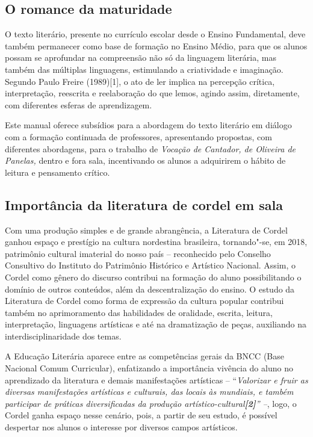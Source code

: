 \documentclass[12pt]{extarticle}
\begin{document}


\subsection{O romance da maturidade}

O texto literário, presente no currículo escolar desde o Ensino
Fundamental, deve também permanecer como base de formação no Ensino
Médio, para que os alunos possam se aprofundar na compreensão não só da
linguagem literária, mas também das múltiplas linguagens, estimulando a
criatividade e imaginação. Segundo Paulo Freire (1989){[}1{]}, o ato de
ler implica na percepção crítica, interpretação, reescrita e
reelaboração do que lemos, agindo assim, diretamente, com diferentes
esferas de aprendizagem.

Este manual oferece subsídios para a abordagem do texto literário em
diálogo com a formação continuada de professores, apresentando
propostas, com diferentes abordagens, para o trabalho de \emph{Vocação
de Cantador, de Oliveira de Panelas,} dentro e fora sala, incentivando
os alunos a adquirirem o hábito de leitura e pensamento crítico.

\subsection{Importância da literatura de cordel em sala}

Com uma produção simples e de grande abrangência, a Literatura de Cordel
ganhou espaço e prestígio na cultura nordestina brasileira, tornando"-se,
em 2018, patrimônio cultural imaterial do nosso país -- reconhecido pelo
Conselho Consultivo do Instituto do Patrimônio Histórico e Artístico
Nacional. Assim, o Cordel como gênero do discurso contribui na formação
do aluno possibilitando o domínio de outros conteúdos, além da
descentralização do ensino. O estudo da Literatura de Cordel como forma
de expressão da cultura popular contribui também no aprimoramento das
habilidades de oralidade, escrita, leitura, interpretação, linguagens
artísticas e até na dramatização de peças, auxiliando na
interdisciplinaridade dos temas.

A Educação Literária aparece entre as competências gerais da BNCC (Base
Nacional Comum Curricular), enfatizando a importância vivência do aluno
no aprendizado da literatura e demais manifestações artísticas --
``\emph{Valorizar e fruir as diversas manifestações artísticas e
culturais, das locais às mundiais, e também participar de práticas
diversificadas da produção artístico-cultural\textbf{{[}2{]}}'' --},
logo, o Cordel ganha espaço nesse cenário, pois, a partir de seu estudo,
é possível despertar nos alunos o interesse por diversos campos
artísticos.
\end{document}
